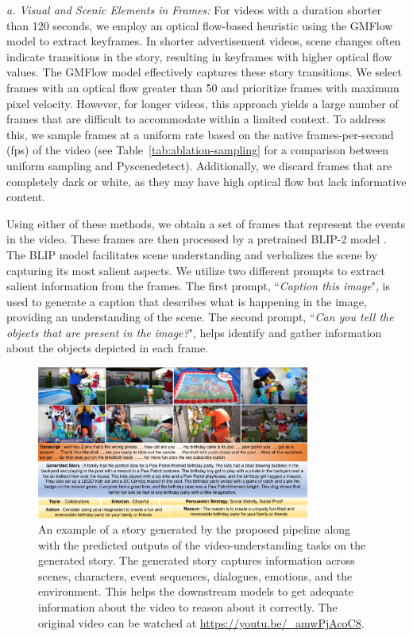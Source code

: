 \documentclass[hidelinks,11pt,a4paper]{report}
\renewcommand{\cite}[1]{\citep{#1}}
\begin{document}
\textit{a. Visual and Scenic Elements in Frames:} For videos with a duration shorter than 120 seconds, we employ an optical flow-based heuristic using the GMFlow model \cite{xu2022gmflow} to extract keyframes. In shorter advertisement videos, scene changes often indicate transitions in the story, resulting in keyframes with higher optical flow values. The GMFlow model effectively captures these story transitions. We select frames with an optical flow greater than 50 and prioritize frames with maximum pixel velocity. However, for longer videos, this approach yields a large number of frames that are difficult to accommodate within a limited context. To address this, we sample frames at a uniform rate based on the native frames-per-second (fps) of the video (see Table~\ref{tab:ablation-sampling} for a comparison between uniform sampling and Pyscenedetect). Additionally, we discard frames that are completely dark or white, as they may have high optical flow but lack informative content.

Using either of these methods, we obtain a set of frames that represent the events in the video. These frames are then processed by a pretrained BLIP-2 model \cite{li2023blip2}. The BLIP model facilitates scene understanding and verbalizes the scene by capturing its most salient aspects. We utilize two different prompts to extract salient information from the frames. The first prompt, ``\textit{Caption this image}", is used to generate a caption that describes what is happening in the image, providing an understanding of the scene. The second prompt, ``\textit{Can you tell the objects that are present in the image?}", helps identify and gather information about the objects depicted in each frame.


\begin{figure}[!t]
    \centering
    \includegraphics[width=0.8\textwidth]{images/example-stories.pdf}
    \caption{An example of a story generated by the proposed pipeline along with the predicted outputs of the video-understanding tasks on the generated story. The generated story captures information across scenes, characters, event sequences, dialogues, emotions, and the environment. This helps the downstream models to get adequate information about the video to reason about it correctly. The original video can be watched at \url{https://youtu.be/_amwPjAcoC8}.}
    \label{fig:example-story}
\end{figure}
\end{document}
